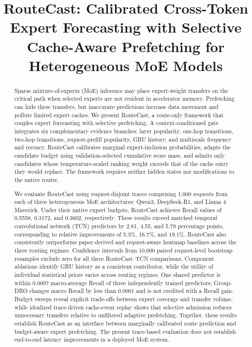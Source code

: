 \documentclass[conference]{IEEEtran}
\title{RouteCast: Calibrated Cross-Token Expert Forecasting with Selective Cache-Aware Prefetching for Heterogeneous MoE Models}
\author{\IEEEauthorblockN{Jihua Dong}
\IEEEauthorblockA{\textit{School of Microelectronics} \\
\textit{University of Electronic Science and Technology of China}\\
Chengdu, China \\
2023190903038@std.uestc.edu.cn}}
\begin{document}
\maketitle
\begin{abstract}
Sparse mixture-of-experts (MoE) inference may place expert-weight transfers on
the critical path when selected experts are not resident in accelerator memory.
Prefetching can hide these transfers, but inaccurate predictions increase data
movement and pollute limited expert caches. We present RouteCast, a route-only
framework that couples expert forecasting with selective prefetching. A
context-conditioned gate integrates six complementary evidence branches:
layer popularity, one-hop transitions, two-hop transitions, request-prefill
popularity, GRU history, and multiscale frequency and recency. RouteCast
calibrates marginal expert-inclusion probabilities, adapts the candidate
budget using validation-selected cumulative score mass, and admits only
candidates whose temperature-scaled ranking weight exceeds that of
the cache entry they would replace. The framework requires neither hidden
states nor modifications to
the native router.

We evaluate RouteCast using request-disjoint traces comprising 1,000 requests
from each of three heterogeneous MoE architectures: Qwen3, DeepSeek-R1, and
Llama 4 Maverick. Under their native expert budgets, RouteCast achieves Recall
values of 0.5558, 0.3172, and 0.3602, respectively. These results exceed
matched temporal convolutional network (TCN) predictors by 2.81, 4.55, and
5.79 percentage points, corresponding to relative improvements of 5.3\%,
16.7\%, and 19.1\%. RouteCast also consistently outperforms paper-derived and
request-aware heatmap baselines across the three routing regimes. Confidence
intervals from 10,000 paired request-level bootstrap resamples exclude zero
for all three RouteCast--TCN comparisons. Component ablations identify GRU
history as a consistent contributor, while the utility of individual
statistical priors varies across routing regimes. One shared predictor is
within 0.0007 macro-average Recall of three independently trained predictors;
Group-DRO changes macro Recall by less than 0.0001 and is not credited with a
Recall gain. Budget sweeps reveal
explicit trade-offs between
expert coverage and transfer volume, while idealized trace-driven cache-event replay shows
that selective admission reduces unnecessary transfers relative to unfiltered
adaptive prefetching. Together, these results establish RouteCast as an
interface between marginally calibrated route prediction and budget-aware expert
prefetching. The present trace-based evaluation does not establish
end-to-end latency improvements in a deployed MoE system.
\end{abstract}
\end{document}
